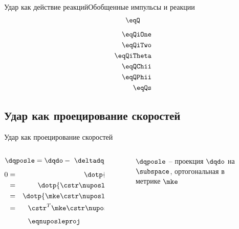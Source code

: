 \documentclass{beamer}
\begin{document}
\begin{frame}{Удар как действие реакций}{Обобщенные импульсы и реакции}
    \vspace{-5pt}
    $$ \eqQ $$
    \vspace{-15pt}
    \begin{eqnarray*}
    \eqQiOne \\
    \eqQiTwo \\
    \eqQiTheta \\
    \eqQChii \\
    \eqQPhii \\
    \eqQs
    \end{eqnarray*}
\end{frame}

\subsection{Удар как проецирование скоростей}

\begin{frame}{Удар как проецирование скоростей}
    \begin{columns}
        \hspace{15pt}
        \begin{column}{0.35\textwidth}
            $$ \dqposle = \dqdo -\ \deltadq = \mathbf{V}\nuposle \in \subspace $$
            \begin{eqnarray*}
                0 & = & \dotp{\deltadq}{\mke\cstr} \\
                  & = & \dotp{\cstr\nuposle - \dqdo}{\mke\cstr} \\
                  & = & \dotp{\mke\cstr\nuposle - \mke\dqdo}{\cstr} \\
                  & = & \cstr^T\mke\cstr\nuposle - \cstr^T\mke\dqdo
            \end{eqnarray*}
            \vspace{0.35pt}
            $$ \eqnuposleproj $$
        \end{column}
        \hspace{55pt}
        \begin{column}{0.65\textwidth}
            \begin{figure}
                \hspace{-65pt}
                \caption{
                    $\dqposle$ -- проекция $\dqdo$ на $\subspace$,\newline
                    ортогональная в метрике $\mke$
                }
            \end{figure}
        \end{column}
    \end{columns}
\end{frame}
\end{document}
